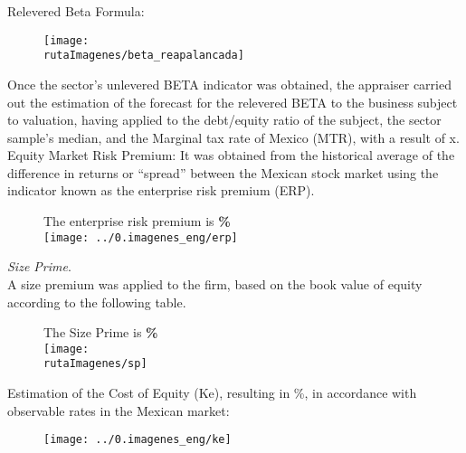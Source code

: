 Relevered Beta Formula:\\

\begin{figure}[H]
\centering
\texttt{[image: \\rutaImagenes/beta\_reapalancada]}
\end{figure}

Once the sector's unlevered BETA indicator was obtained, the appraiser carried out the estimation of the forecast for the relevered BETA to the business subject to valuation, having applied to the debt/equity ratio of the subject, the sector sample's median, and the Marginal tax rate of Mexico (MTR), with a result of  \textcolor{principal}{\betaReapalancada x}.\\

\textcolor{principal}{Equity Market Risk Premium:} It was obtained from the historical average of the difference in returns or ``spread'' between the Mexican stock market using the indicator known as the   enterprise risk premium (ERP).\\

\begin{figure}[H]
\centering
The enterprise risk premium is \textbf{\textcolor{principal}{\erpValor\%}} \\[10pt]

\texttt{[image: ../0.imagenes\_eng/erp]}
\end{figure}

\textcolor{principal}{\textit{Size Prime}.} \\[5pt]

A size premium was applied to the firm, based on the book value of equity according to the following table.\\


\begin{figure}[H]
\centering
The Size Prime is \textbf{\textcolor{principal}{\sizePrime\%}} \\
\texttt{[image: \\rutaImagenes/sp]}
\end{figure}


Estimation of the Cost of Equity (Ke), resulting in \textcolor{principal}{\keValor\%}, 
in accordance with observable rates in the Mexican market:

\begin{figure}[H]
\centering
\texttt{[image: ../0.imagenes\_eng/ke]}
\end{figure}









